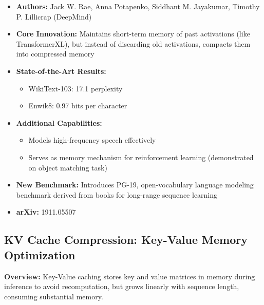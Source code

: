 \documentclass[11pt]{article}
\begin{document}
\begin{itemize}[leftmargin=*]
    \item \textbf{Authors:} Jack W. Rae, Anna Potapenko, Siddhant M. Jayakumar, Timothy P. Lillicrap (DeepMind)
    \item \textbf{Core Innovation:} Maintains short-term memory of past activations (like TransformerXL), but instead of discarding old activations, compacts them into compressed memory
    \item \textbf{State-of-the-Art Results:}
    \begin{itemize}
        \item WikiText-103: 17.1 perplexity
        \item Enwik8: 0.97 bits per character
    \end{itemize}
    \item \textbf{Additional Capabilities:}
    \begin{itemize}
        \item Models high-frequency speech effectively
        \item Serves as memory mechanism for reinforcement learning (demonstrated on object matching task)
    \end{itemize}
    \item \textbf{New Benchmark:} Introduces PG-19, open-vocabulary language modeling benchmark derived from books for long-range sequence learning
    \item \textbf{arXiv:} 1911.05507
\end{itemize}

\subsection{KV Cache Compression: Key-Value Memory Optimization}

\textbf{Overview:} Key-Value caching stores key and value matrices in memory during inference to avoid recomputation, but grows linearly with sequence length, consuming substantial memory.
\end{document}
